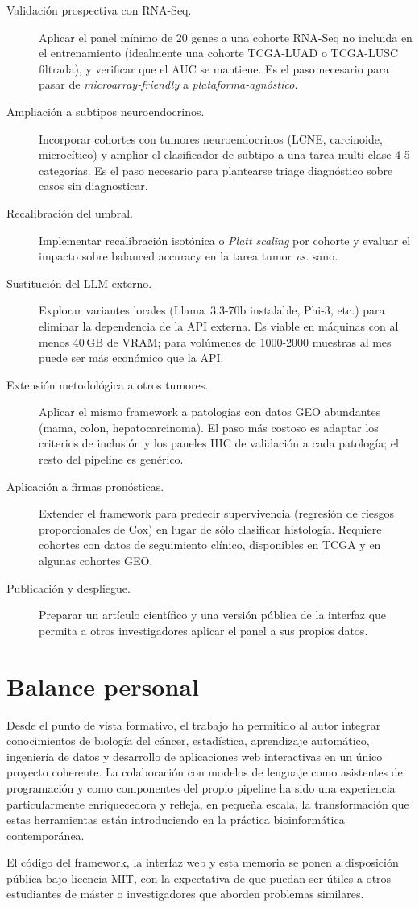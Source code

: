 \begin{description}
  \item[Validación prospectiva con RNA-Seq.] Aplicar el panel mínimo de
  20 genes a una cohorte RNA-Seq no incluida en el entrenamiento
  (idealmente una cohorte TCGA-LUAD o TCGA-LUSC filtrada), y verificar
  que el AUC se mantiene. Es el paso necesario para pasar de
  \emph{microarray-friendly} a \emph{plataforma-agnóstico}.
  \item[Ampliación a subtipos neuroendocrinos.] Incorporar cohortes con
  tumores neuroendocrinos (LCNE, carcinoide, microcítico) y ampliar el
  clasificador de subtipo a una tarea multi-clase 4-5 categorías. Es el
  paso necesario para plantearse triage diagnóstico sobre casos sin
  diagnosticar.
  \item[Recalibración del umbral.] Implementar recalibración isotónica o
  \emph{Platt scaling} por cohorte y evaluar el impacto sobre balanced
  accuracy en la tarea tumor \emph{vs.} sano.
  \item[Sustitución del LLM externo.] Explorar variantes locales
  (Llama~3.3-70b instalable, Phi-3, etc.) para eliminar la dependencia
  de la API externa. Es viable en máquinas con al menos 40\,GB de VRAM;
  para volúmenes de 1000-2000 muestras al mes puede ser más económico
  que la API.
  \item[Extensión metodológica a otros tumores.] Aplicar el mismo
  framework a patologías con datos GEO abundantes (mama, colon,
  hepatocarcinoma). El paso más costoso es adaptar los criterios de
  inclusión y los paneles IHC de validación a cada patología; el resto
  del pipeline es genérico.
  \item[Aplicación a firmas pronósticas.] Extender el framework para
  predecir supervivencia (regresión de riesgos proporcionales de Cox) en
  lugar de sólo clasificar histología. Requiere cohortes con datos de
  seguimiento clínico, disponibles en TCGA y en algunas cohortes GEO.
  \item[Publicación y despliegue.] Preparar un artículo científico y una
  versión pública de la interfaz que permita a otros investigadores
  aplicar el panel a sus propios datos.
\end{description}

\section{Balance personal}
\label{sec:conc_balance}

Desde el punto de vista formativo, el trabajo ha permitido al autor
integrar conocimientos de biología del cáncer, estadística, aprendizaje
automático, ingeniería de datos y desarrollo de aplicaciones web
interactivas en un único proyecto coherente. La colaboración con
modelos de lenguaje como asistentes de programación y como componentes
del propio pipeline ha sido una experiencia particularmente enriquecedora
y refleja, en pequeña escala, la transformación que estas herramientas
están introduciendo en la práctica bioinformática contemporánea.

El código del framework, la interfaz web y esta memoria se ponen a
disposición pública bajo licencia MIT, con la expectativa de que puedan
ser útiles a otros estudiantes de máster o investigadores que aborden
problemas similares.
